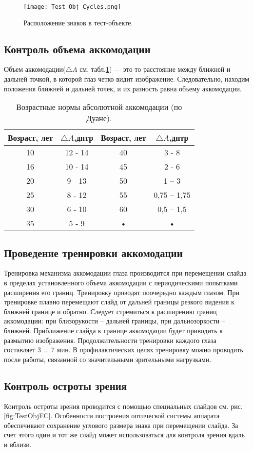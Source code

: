 \begin{figure}[ht]
	\centering
	\texttt{[image: Test\_Obj\_Cycles.png]}
	\caption{Расположение знаков в тест-объекте.}
	\label{fig:TestObjC}
\end{figure}
\subsection{Контроль объема аккомодации}
Объем аккомодации($\triangle A$ см. табл.\ref{tab:AccDuane}) --- это то расстояние между ближней и дальней точкой, в которой глаз четко видит изображение. Следовательно, находим положения ближней и дальней точек, и их разность равна объему аккомодации.
\begin{table}
\centering
\begin{tabular}{|c|c|c|c|}
\hline 
Возраст, лет &$\triangle A$,дптр & Возраст, лет & $\triangle A$,дптр \\ 
\hline 
10 & 12 - 14 & 40 & 3 - 8 \\ 
\hline 
16 & 10 - 14 & 45 & 2 - 6 \\ 
\hline 
20 & 9 - 13 & 50 & 1 – 3 \\ 
\hline 
25 & 8 - 12 & 55 & 0,75 – 1,75 \\ 
\hline 
30 & 6 - 10 & 60 & 0,5 – 1,5 \\ 
\hline 
35 & 5 - 9 & • & • \\ 
\hline 
\end{tabular} 
\caption{Возрастные нормы абсолютной аккомодации (по Дуане).}
\label{tab:AccDuane}
\end{table}
\subsection{Проведение тренировки аккомодации}
Тренировка механизма аккомодации глаза производится при перемещении слайда в пределах установленного объема аккомодации с периодическими попытками расширения его границ. Тренировку проводят поочередно каждым глазом. При тренировке плавно перемещают слайд от дальней границы резкого видения к ближней границе и обратно. Следует стремиться к расширению границ аккомодации: при близорукости – дальней границы, при дальнозоркости – ближней. Приближение слайда к границе аккомодации будет приводить к размытию изображения.  Продолжительности тренировки каждого глаза составляет 3 ... 7 мин. В профилактических целях тренировку можно проводить после работы, связанной со значительными зрительными нагрузками.
\subsection{Контроль остроты зрения}
Контроль остроты зрения проводится с помощью специальных слайдов см. рис.\ref{fig:TestObjEC}. Особенности построения оптической системы аппарата обеспечивают сохранение углового размера знака при перемещении слайда. За счет этого один и тот же слайд может использоваться для контроля зрения вдаль и вблизи.

